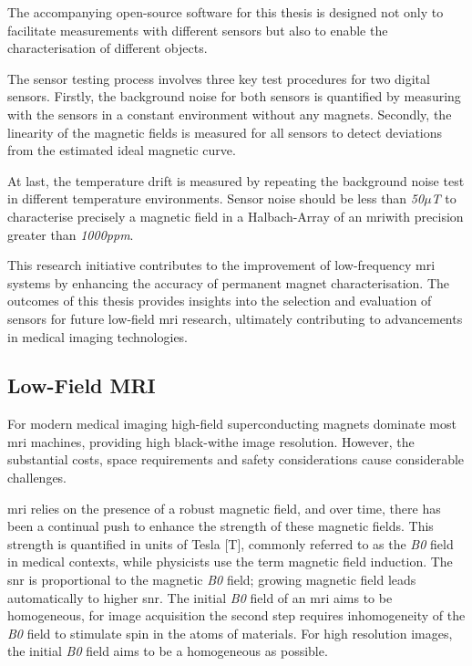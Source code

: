 The accompanying open-source software for this thesis is designed not
only to facilitate measurements with different sensors but also to
enable the characterisation of different objects.

The sensor testing process involves three key test procedures for two
digital sensors. Firstly, the background noise for both sensors is
quantified by measuring with the sensors in a constant environment
without any magnets. Secondly, the linearity of the magnetic fields is
measured for all sensors to detect deviations from the estimated ideal
magnetic curve.

At last, the temperature drift is measured by repeating the background
noise test in different temperature environments. Sensor noise should be
less than \emph{50\(\mu\)T} to characterise precisely a magnetic field
in a Halbach-Array of an \gls{mri}with precision greater than
\emph{1000\gls{ppm}}.

This research initiative contributes to the improvement of low-frequency
\gls{mri} systems by enhancing the accuracy of permanent magnet
characterisation. The outcomes of this thesis provides insights into the
selection and evaluation of sensors for future low-field \gls{mri}
research, ultimately contributing to advancements in medical imaging
technologies.

\hypertarget{low-field-mri}{%
\subsection{Low-Field MRI}\label{low-field-mri}}

For modern medical imaging high-field superconducting magnets dominate
most \gls{mri} machines, providing high black-withe image resolution.
However, the substantial costs, space requirements and safety
considerations cause considerable challenges.

\gls{mri} relies on the presence of a robust magnetic field, and over
time, there has been a continual push to enhance the strength of these
magnetic fields. This strength is quantified in units of Tesla {[}T{]},
commonly referred to as the \emph{B0} field in medical contexts, while
physicists use the term magnetic field induction. The \gls{snr} is
proportional to the magnetic \emph{B0} field; growing magnetic field
leads automatically to higher \gls{snr}. The initial \emph{B0} field of
an \gls{mri} aims to be homogeneous, for image acquisition the second
step requires inhomogeneity of the \emph{B0} field to stimulate spin in
the atoms of materials. For high resolution images, the initial
\emph{B0} field aims to be a homogeneous as possible.

